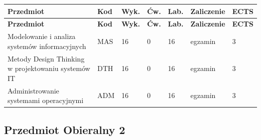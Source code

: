\documentclass[12pt,a4paper]{article}
\newcommand{\thdrule}{\noalign{\global\setlength{\extrarowheight}{0pt}}}
\newcommand{\thdend}{\noalign{\global\setlength{\extrarowheight}{4pt}}}
\begin{document}
{\scriptsize
\begin{longtable}{m{5.5cm}m{0.8cm}m{1cm}m{1cm}m{1cm}m{1.7cm}m{0.7cm}}
\thdrule\toprule
\rowcolor{pjatkRed}
{\color{white}\footnotesize\textbf{\vphantom{Ag}Przedmiot}} & {\color{white}\footnotesize\textbf{\vphantom{Ag}Kod}} & {\color{white}\footnotesize\textbf{\vphantom{Ag}Wyk.}} & {\color{white}\footnotesize\textbf{\vphantom{Ag}Ćw.}} & {\color{white}\footnotesize\textbf{\vphantom{Ag}Lab.}} & {\color{white}\footnotesize\textbf{\vphantom{Ag}Zaliczenie}} & {\color{white}\footnotesize\textbf{\vphantom{Ag}ECTS}} \\
\midrule\thdend
\endfirsthead
\thdrule\toprule
\rowcolor{pjatkRed}
{\color{white}\footnotesize\textbf{\vphantom{Ag}Przedmiot}} & {\color{white}\footnotesize\textbf{\vphantom{Ag}Kod}} & {\color{white}\footnotesize\textbf{\vphantom{Ag}Wyk.}} & {\color{white}\footnotesize\textbf{\vphantom{Ag}Ćw.}} & {\color{white}\footnotesize\textbf{\vphantom{Ag}Lab.}} & {\color{white}\footnotesize\textbf{\vphantom{Ag}Zaliczenie}} & {\color{white}\footnotesize\textbf{\vphantom{Ag}ECTS}} \\
\midrule\thdend
\endhead
\rowcolor{tableRowLight} Modelowanie i analiza systemów informacyjnych & MAS & 16 & 0 & 16 & {\scriptsize egzamin} & 3 \\
\rowcolor{tableRowAlt} Metody Design Thinking w projektowaniu systemów IT & DTH & 16 & 0 & 16 & {\scriptsize egzamin} & 3 \\
\rowcolor{tableRowLight} Administrowanie systemami operacyjnymi & ADM & 16 & 0 & 16 & {\scriptsize egzamin} & 3 \\
\bottomrule
\end{longtable}}

\subsection*{Przedmiot Obieralny 2}
\end{document}
